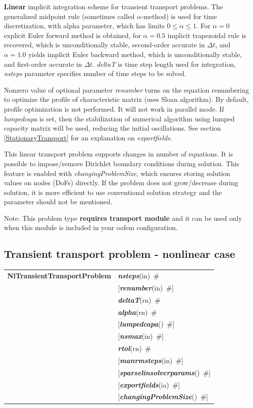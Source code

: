 \documentclass[a4paper]{article}
\makeatletter
\newcommand{\param}[1]{{\em #1}}
\newcommand{\keywordnotype}[1]{\mbox{{\it{\bf{#1}}}}}
\newcommand{\keyword}[2]{\mbox{{\keywordnotype{#1}\tiny (#2)}}}
\newcommand{\entKeywordInst}[1]{\mbox{{\bf{{#1}}}}}
\newcommand{\field}[2]{\mbox{\keyword{#1}{#2}~\#}}
\newcommand{\optField}[2]{\mbox{[\field{#1}{#2}]}}
\newenvironment{record}[1][]{\begin{tabular}{|ll}}{\end{tabular}\\}
\newcommand{\recentry}[2]{{#1}&{#2}\\}
\newcounter{rcc}
\newenvironment{record}[1][\textwidth]{\setcounter{rcc}{0}\begin{tabular*}{#1}{|ll@{\extracolsep{\fill}}r}}{\end{tabular*}\\}
\newcommand{\recentry}[2]{\ifthenelse{\value{rcc}>0}{&$\backslash$ \\}{\setcounter{rcc}{1}}{#1}&{#2}}
\makeatother
\begin{document}
{\bf Linear} implicit
integration scheme for transient transport problems. The generalized
midpoint rule (sometimes called $\alpha$-method) is used for time discretization, with alpha parameter,
which has limits $0\le\alpha\le1$. For $\alpha=0$ explicit Euler
forward method is obtained, for $\alpha=0.5$ implicit trapezoidal rule
is recovered, which is unconditionally stable, second-order accurate
in $\Delta t$, and $\alpha=1.0$ yields implicit Euler backward method,
which is unconditionally stable, and first-order accurate
in $\Delta t$. \param{deltaT} is time step length used for
integration, \param{nsteps} parameter specifies
number of time steps to be solved.

Nonzero value of optional parameter \param{renumber} turns on the
equation renumbering to optimize the profile of characteristic matrix
(uses Sloan algorithm). By default, profile optimization is not
performed. It will not work in parallel mode.
If \param{lumpedcapa} is set, then the stabilization of numerical
algorithm using lumped capacity matrix will be used, reducing the
initial oscillations.
See section \ref{StationaryTransport} for an explanation on
\param{exportfields}.

This linear transport problem supports changes in number of equations. It is possible to impose/remove
Dirichlet boundary conditions during solution. This feature is enabled with \param{changingProblemSize}, which ensures
storing solution values on nodes (DoFs) directly. If the problem does not grow/decrease during solution, it is more efficient
to use conventional solution strategy and the parameter should not be mentioned.

Note: This problem type {\bf requires transport module} and it
can be used only when this module is included in your oofem
configuration.

\subsection{Transient transport problem - nonlinear case}
\label{TransientTransport}

\begin{record}
\recentry{\entKeywordInst{NlTransientTransportProblem}}{\field{nsteps}{in}}
\recentry{}{\optField{renumber}{in}}
\recentry{}{\field{deltaT}{rn}} \recentry{}{\field{alpha}{rn}} \recentry{}{\optField{lumpedcapa}{}}
\recentry{}{\optField{nsmax}{in}} \recentry{}{\field{rtol}{rn}} \recentry{}{\optField{manrmsteps}{in}}
\recentry{}{\optField{sparselinsolverparams}{}}
\recentry{}{\optField{exportfields}{ia}}
\recentry{}{\optField{changingProblemSize}{}}
\end{record}
\end{document}
